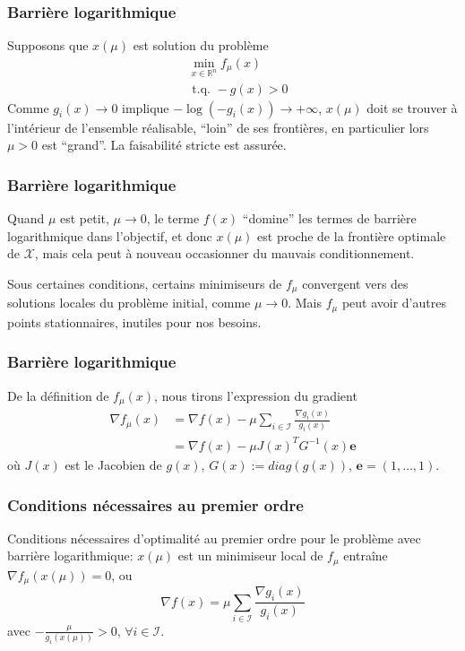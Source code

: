 \documentclass[usepdftitle=false]{beamer}
\def\cI{\mathcal{I}}
\def\cX{\mathcal{X}}
\def\be{\boldsymbol{e}}
\def\RR{\mathbb{R}}
\begin{document}
\begin{frame}
\frametitle{Barrière logarithmique}

Supposons que $x(\mu)$ est solution du problème
\begin{align*}
& \min_{x \in \RR^n} f_{\mu}(x) \\
& \mbox{ t.q. } -g(x) > 0
\end{align*}
Comme $g_i(x) \rightarrow 0$ implique $-\log (-g_i(x)) \rightarrow +\infty$, $x(\mu)$ doit se trouver à l'intérieur de l'ensemble réalisable, ``loin'' de ses frontières, en particulier lors $\mu > 0$ est ``grand''.
La faisabilité stricte est assurée.

\end{frame}

\begin{frame}
\frametitle{Barrière logarithmique}

Quand $\mu$ est petit, $\mu \rightarrow 0$, le terme $f(x)$ ``domine'' les termes de barrière logarithmique dans l'objectif, et donc $x(\mu)$ est proche de la frontière optimale de $\cX$, mais cela peut à nouveau occasionner du mauvais conditionnement.

\mbox{}

Sous certaines conditions, certains minimiseurs de $f_{\mu}$ convergent vers des solutions locales du problème initial, comme $\mu \rightarrow 0$.
Mais $f_{\mu}$ peut avoir d'autres points stationnaires, inutiles pour nos besoins.

\end{frame}

\begin{frame}
\frametitle{Barrière logarithmique}

De la définition de $f_{\mu}(x)$,
nous tirons l'expression du gradient
\begin{align*}
\nabla f_{\mu}(x) &= \nabla f(x) - \mu \sum_{i \in \cI} \frac{\nabla g_i(x)}{g_i(x)} \\
&= \nabla f(x) - \mu J(x)^T G^{-1}(x)\be
\end{align*}
où $J(x)$ est le Jacobien de $g(x)$, $G(x) := diag(g(x))$, $\be = (1,\ldots, 1)$.

\end{frame}

\begin{frame}
\frametitle{Conditions nécessaires au premier ordre}

Conditions nécessaires d'optimalité au premier ordre pour le problème avec barrière logarithmique: $x(\mu)$ est un minimiseur local de $f_{\mu}$ entraîne $\nabla f_{\mu}(x(\mu)) = 0$, ou
$$
\nabla f(x) = \mu \sum_{i \in \cI} \frac{\nabla g_i(x)}{g_i(x)}
$$
avec $-\frac{\mu}{g_i(x(\mu))} > 0$, $\forall i \in \cI$.

\end{frame}
\end{document}
